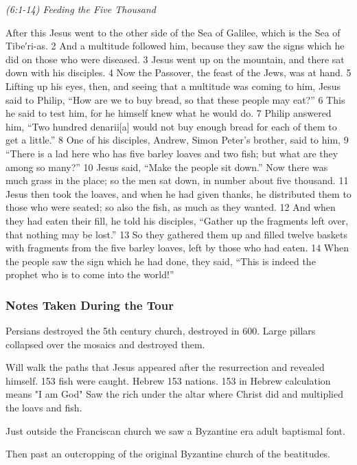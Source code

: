 \documentclass[letterpaper]{report}
\begin{document}
{\centering
	\emph{(6:1-14) Feeding the Five Thousand}\\
}
\begin{multicols}{2}
After this Jesus went to the other side of the Sea of Galilee, which is the Sea of Tibe′ri-as. 2 And a multitude followed him, because they saw the signs which he did on those who were diseased. 3 Jesus went up on the mountain, and there sat down with his disciples. 4 Now the Passover, the feast of the Jews, was at hand. 5 Lifting up his eyes, then, and seeing that a multitude was coming to him, Jesus said to Philip, “How are we to buy bread, so that these people may eat?” 6 This he said to test him, for he himself knew what he would do. 7 Philip answered him, “Two hundred denarii[a] would not buy enough bread for each of them to get a little.” 8 One of his disciples, Andrew, Simon Peter’s brother, said to him, 9 “There is a lad here who has five barley loaves and two fish; but what are they among so many?” 10 Jesus said, “Make the people sit down.” Now there was much grass in the place; so the men sat down, in number about five thousand. 11 Jesus then took the loaves, and when he had given thanks, he distributed them to those who were seated; so also the fish, as much as they wanted. 12 And when they had eaten their fill, he told his disciples, “Gather up the fragments left over, that nothing may be lost.” 13 So they gathered them up and filled twelve baskets with fragments from the five barley loaves, left by those who had eaten. 14 When the people saw the sign which he had done, they said, “This is indeed the prophet who is to come into the world!”
\end{multicols}

\subsubsection{Notes Taken During the Tour}
Persians destroyed the 5th century church, destroyed in 600. Large pillars collapsed over the mosaics and destroyed them.

Will walk the paths that Jesus appeared after the resurrection and revealed himself.
153 fish were caught.
Hebrew 153 nations. 153 in Hebrew calculation means "I am God"
Saw the rich under the altar where Christ did and multiplied the loavs and fish.

Just outside the Franciscan church we saw a Byzantine era adult  baptismal font.

Then past an outcropping of the original Byzantine church of the beatitudes.
\end{document}

